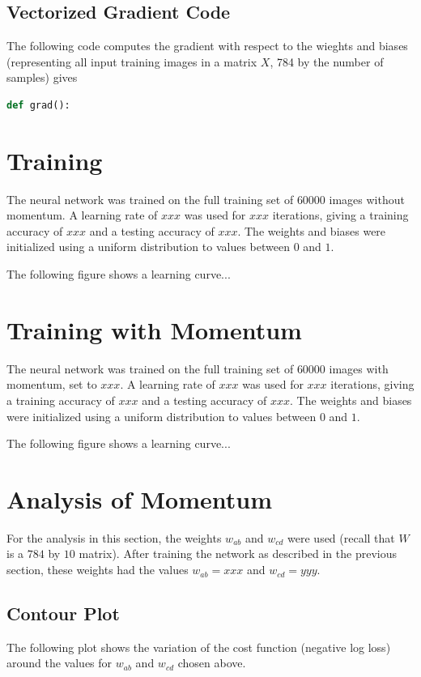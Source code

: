 \documentclass{article}
\begin{document}
   \subsection{Vectorized Gradient Code}
   The following code computes the gradient with respect to the wieghts and biases
   (representing all input training images in a matrix $X$, 784 by the number of samples) gives
      \begin{lstlisting}[language=Python]
         def grad():
      \end{lstlisting}


   \section{Training}
   The neural network was trained on the full training set of $60000$ images without momentum.
   A learning rate of $xxx$ was used for $xxx$ iterations, giving a training accuracy of $xxx$
   and a testing accuracy of $xxx$.
   The weights and biases were initialized using a uniform distribution to values between $0$ and $1$.

   The following figure shows a learning curve...

   \section{Training with Momentum}
   The neural network was trained on the full training set of $60000$ images with momentum, set to $xxx$.
   A learning rate of $xxx$ was used for $xxx$ iterations, giving a training accuracy of $xxx$
   and a testing accuracy of $xxx$.
   The weights and biases were initialized using a uniform distribution to values between $0$ and $1$.

   The following figure shows a learning curve...


   \section{Analysis of Momentum}
   For the analysis in this section, the weights $w_{ab}$ and $w_{cd}$ were used (recall that $W$ is
   a $784$ by $10$ matrix). After training the network as described in the previous section,
   these weights had the values $w_{ab} = xxx$ and $w_{cd} = yyy$.

   \subsection{Contour Plot}
   The following plot shows the variation of the cost function (negative log loss) around the
   values for $w_{ab}$ and $w_{cd}$ chosen above.
\end{document}
